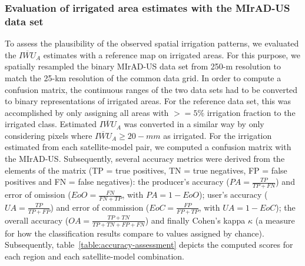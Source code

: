 \documentclass[hess, manuscript]{copernicus}
\begin{document}
\subsubsection{Evaluation of irrigated area estimates with the MIrAD-US data set}
\label{ssec:irrigated-area-comparison}
To assess the plausibility of the observed spatial irrigation patterns, we evaluated the $\overline{IWU}_{A}$ estimates with a reference map on irrigated areas. For this purpose, we spatially resampled the binary MIrAD-US data set from 250-m resolution to match the 25-km resolution of the common data grid. In order to compute a confusion matrix, the continuous ranges of the two data sets had to be converted to binary representations of irrigated areas. For the reference data set, this was accomplished by only assigning all areas with $>=5\%$ irrigation fraction to the irrigated class. Estimated $\overline{IWU}_{A}$ was converted in a similar way by only considering pixels where $\overline{IWU}_{A} \geq 20-mm$ as irrigated. For the irrigation estimated from each satellite-model pair, we computed a confusion matrix with the MIrAD-US. Subsequently, several accuracy metrics were derived from the elements of the matrix (TP = true positives, TN = true negatives, FP = false positives and FN = false negatives): the producer's accuracy ($PA=\frac{TP}{TP+FN}$) and error of omission ($EoO=\frac{FN}{FN+TP}$, with $PA=1-EoO$); user's accuracy ($UA=\frac{TP}{TP+FP}$) and error of commission ($EoC=\frac{FP}{FP+TP}$, with $UA=1-EoC$); the overall accuracy ($OA=\frac{TP+TN}{TP+TN+FP+FN}$) and finally Cohen's kappa $\kappa$ (a measure for how the classification results compare to values assigned by chance). Subsequently, table~\ref{table:accuracy-assessment} depicts the computed scores for each region and each satellite-model combination.\\
\end{document}
